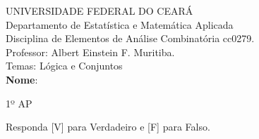 \documentclass[a4paper,12pt]{letter}  %
\begin{document}
\thispagestyle{empty}

UNIVERSIDADE FEDERAL DO CEARÁ\\
Departamento de Estatística e Matemática Aplicada\\
Disciplina de Elementos de Análise Combinatória cc0279.\\
Professor: Albert Einstein F. Muritiba.\\
Temas: Lógica e Conjuntos\\[0.2cm]
\textbf{Nome}: \makebox[380pt]{\hrulefill} \vspace{2pt}
\begin{center}
	1º AP
\end{center}
Responda [V] para Verdadeiro e [F] para Falso.
\end{document}
